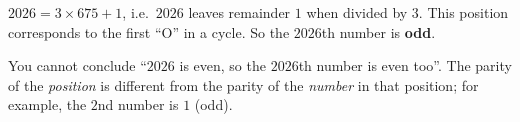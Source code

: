 {$2026 = 3\times 675 + 1$, i.e.\ $2026$ leaves remainder $1$ when divided by $3$. This position corresponds to the first ``O'' in
a cycle. So the $2026$th number is \textbf{odd}.
\begin{warnbox}You cannot conclude ``$2026$ is even, so the $2026$th number is even too''. The parity of the \emph{position} is
different from the parity of the \emph{number} in that position; for example, the $2$nd number is $1$ (odd).\end{warnbox}
}

